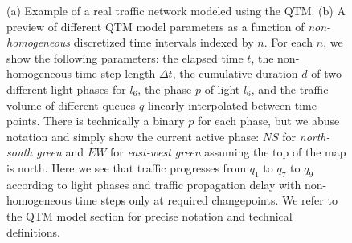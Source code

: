 \begin{figure}[t!]
\centering
\caption{(a) Example of a real traffic network modeled using the
  QTM. (b) A preview of different QTM model parameters as a function
  of \emph{non-homogeneous} discretized time intervals indexed by $n$.
  For each $n$, we show the following parameters: the elapsed time
  $t$, the non-homogeneous time step length $\Delta t$, the cumulative
  duration $d$ of two different light phases for $l_6$, the phase $p$
  of light $l_6$, and the traffic volume of different queues $q$
  linearly interpolated between time points.  There is technically a
  binary $p$ for each phase, but we abuse notation and simply
  show the current active phase: $\mathit{NS}$ for \emph{north-south green} and 
  $\mathit{EW}$ for \emph{east-west green} assuming the top of the map is north.
  Here we see that traffic progresses from $q_1$ to $q_7$ to $q_9$
  according to light phases and traffic propagation delay with non-homogeneous time steps
  only at required changepoints.
  We refer to the QTM model section for
  precise notation and technical definitions.}
\label{fig:qtm}
%
\end{figure}

